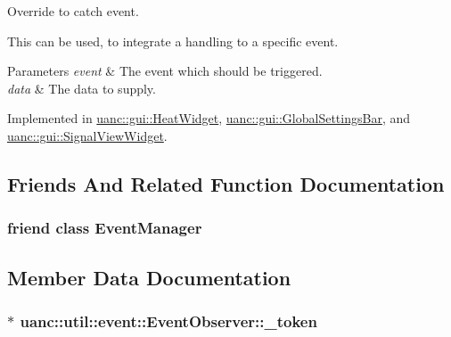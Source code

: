 Override to catch event. 

This can be used, to integrate a handling to a specific event.


\begin{DoxyParams}{Parameters}
{\em event} & The event which should be triggered. \\
\hline
{\em data} & The data to supply. \\
\hline
\end{DoxyParams}


Implemented in \hyperlink{classuanc_1_1gui_1_1_heat_widget_afe92e65ebf7d607ef7e1d40aaaa6131a}{uanc\+::gui\+::\+Heat\+Widget}, \hyperlink{classuanc_1_1gui_1_1_global_settings_bar_a780fabb890235753ff90c1403638c47d}{uanc\+::gui\+::\+Global\+Settings\+Bar}, and \hyperlink{classuanc_1_1gui_1_1_signal_view_widget_a2f070824372de0e83960814229d93b46}{uanc\+::gui\+::\+Signal\+View\+Widget}.



\subsection{Friends And Related Function Documentation}
\subsubsection[{\texorpdfstring{Event\+Manager}{EventManager}}]{\setlength{\rightskip}{0pt plus 5cm}friend class {\bf Event\+Manager}\hspace{0.3cm}{\ttfamily [friend]}}\hypertarget{classuanc_1_1util_1_1event_1_1_event_observer_aba45a46c615e2683daffdae82e2d3b8f}{}\label{classuanc_1_1util_1_1event_1_1_event_observer_aba45a46c615e2683daffdae82e2d3b8f}


\subsection{Member Data Documentation}
\subsubsection[{\texorpdfstring{\+\_\+token}{_token}}]{$\ast$ uanc\+::util\+::event\+::\+Event\+Observer\+::\+\_\+token\hspace{0.3cm}{\ttfamily [protected]}}\hypertarget{classuanc_1_1util_1_1event_1_1_event_observer_a71e5e39d89518e1ec0018227ddd3c368}{}\label{classuanc_1_1util_1_1event_1_1_event_observer_a71e5e39d89518e1ec0018227ddd3c368}


